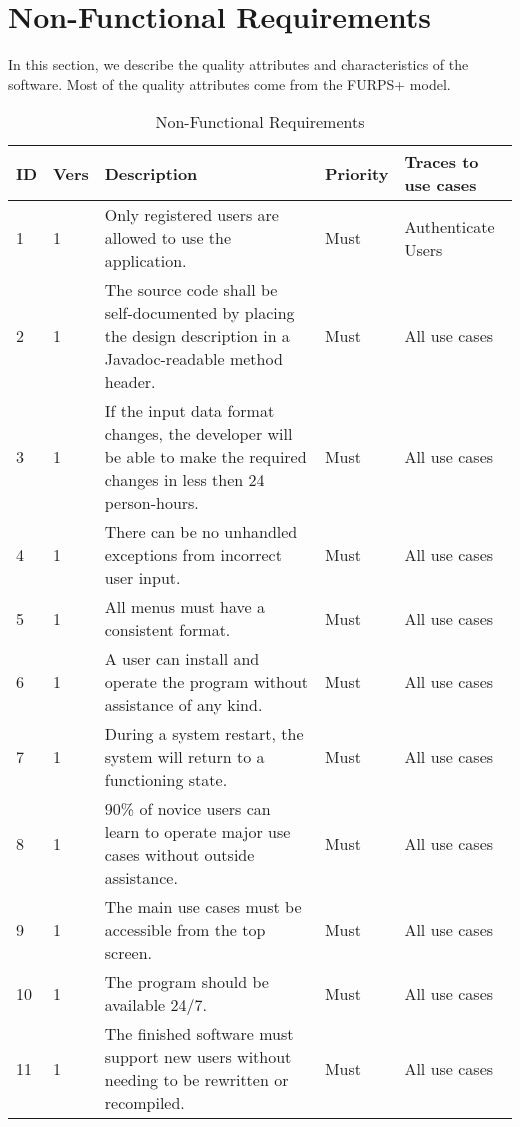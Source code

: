 \documentclass[12pt]{article}
\begin{document}
\section{Non-Functional Requirements}
In this section, we describe the quality attributes and characteristics of the software. Most of the quality attributes come from the FURPS+ model.

\begin{table}[H]
\begin{center}
\begin{tabular} {|p{1cm}|p{1cm}|p{7cm}| p{2cm}|p{3cm}|}
\hline
\textbf{ID} & \textbf{Vers} & \textbf{Description} & \textbf{Priority}  & \textbf{Traces to use cases} \\
\hline 1 & 1 & Only registered users are allowed to use the application. & Must & Authenticate Users \\

\hline 2 & 1 & The source code shall be self-documented by placing the design description in a Javadoc-readable method header.  & Must & All use cases \\

\hline 3 & 1 & If the input data format changes, the developer will be able to make the required changes in less then 24 person-hours.  & Must & All use cases \\

\hline 4 & 1 & There can be no unhandled exceptions from incorrect user input.  & Must & All use cases \\

\hline 5 & 1 & All menus must have a consistent format.  & Must & All use cases \\

\hline 6 & 1 & A user can install and operate the program without assistance of any kind.  & Must & All use cases \\

\hline 7 & 1 & During a system restart, the system will return to a functioning state.   & Must & All use cases \\

\hline 8 & 1 & 90\% of novice users can learn to operate major use cases without outside assistance.   & Must & All use cases \\

\hline 9 & 1 & The main use cases must be accessible from the top screen.  & Must & All use cases \\

\hline 10 & 1 & The program should be available 24/7.   & Must & All use cases \\

\hline 11 & 1 & The finished software must support new users without needing to be rewritten or recompiled. & Must & All use cases \\



\hline
\end{tabular}
\caption{Non-Functional Requirements}
\end{center}
\end{table}
\end{document}
